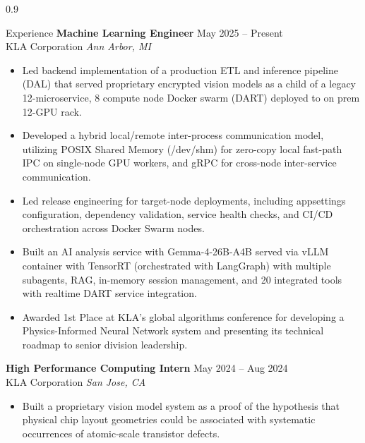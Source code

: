 \documentclass{resume} %
\begin{document}
\begin{spacing}{0.9}
\begin{rSection}{Experience}
\textbf{Machine Learning Engineer} \hfill May 2025 -- Present \\
KLA Corporation \hfill \textit{Ann Arbor, MI}
\vspace{-0.5em}

\begin{itemize}\itemsep 0pt
    \item Led backend implementation of a production ETL and inference pipeline (DAL) that served proprietary encrypted vision models as a child of a legacy 12-microservice, 8 compute node Docker swarm (DART) deployed to on prem 12-GPU rack. 
    
    \item Developed a hybrid local/remote inter-process communication model, utilizing POSIX Shared Memory (/dev/shm) for zero-copy local fast-path IPC on single-node GPU workers, and gRPC for cross-node inter-service communication.

    \item Led release engineering for target-node deployments, including appsettings configuration, dependency validation, service health checks, and CI/CD orchestration across Docker Swarm nodes.
    
    \item Built an AI analysis service with Gemma-4-26B-A4B served via  vLLM container with TensorRT (orchestrated with LangGraph) with multiple subagents, RAG, in-memory session management, and 20 integrated tools with realtime DART service integration. 
    
    \item Awarded 1st Place at KLA's global algorithms conference for developing a Physics-Informed Neural Network system and presenting its technical roadmap to senior division leadership.
        

\end{itemize}
\vspace{-0.25em}

\textbf{High Performance Computing Intern} \hfill May 2024 -- Aug 2024 \\
KLA Corporation \hfill \textit{San Jose, CA}
\vspace{-0.5em}

\begin{itemize}\itemsep 0pt
  \item Built a proprietary vision model system as a proof of the hypothesis that physical chip layout geometries could be associated with systematic occurrences of atomic-scale transistor defects.
 

\end{itemize}
\end{rSection}
\end{spacing}
\end{document}
